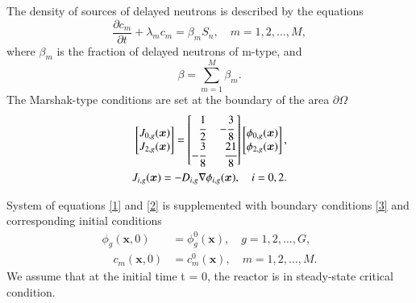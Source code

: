 \documentclass[preprint]{elsarticle}
\begin{document}
The density of sources of delayed neutrons is described by the equations
\begin{equation}\label{2}
	\frac{\partial c_m}{\partial t} + \lambda_m c_m = \beta_m S_{n}, \quad m = 1,2,\dots,M,
\end{equation}
where $\beta_m$ is the fraction of delayed neutrons of m-type, and
\[
	\beta = \sum_{m=1}^{M} \beta_m.
\] 
The Marshak-type conditions are set at the boundary of the area $\partial \Omega$
\begin{equation}\label{3}
\begin{split}
	\begin{bmatrix}
		J_{0,g}(\bm x) \\
		J_{2,g}(\bm x) \\
	\end{bmatrix}
	=
	\begin{bmatrix}
		\phantom{-} \cfrac{1}{2} & - \cfrac{3}{8} \\
	    -\cfrac{3}{8} & \phantom{-} \cfrac{21}{8} \\
	\end{bmatrix}
	\begin{bmatrix}
		\phi_{0,g}(\bm x) \\
		\phi_{2,g}(\bm x) \\
	\end{bmatrix}, \\
	J_{i,g}(\bm x) = - D_{i,g} \nabla \phi_{i,g}(\bm x), \quad i = 0, 2.
\end{split}
\end{equation}

System of equations \eqref{1} and \eqref{2} is supplemented with boundary conditions \eqref{3} and corresponding initial conditions
\begin{equation}\label{4}
\begin{split}
	\phi_g(\bm x,0) & = \phi_g^0(\bm x), \quad g = 1,2,\dots,G, \\ 
	\quad c_m(\bm x,0) & = c_m^0(\bm x), \quad m = 1,2,\dots,M.
\end{split}
\end{equation}
We assume that at the initial time t = 0, the reactor is in steady-state critical condition.
\end{document}
